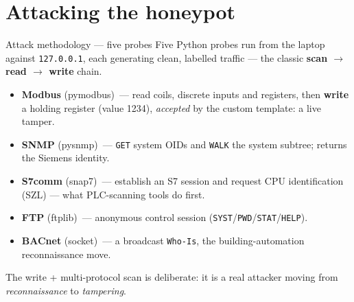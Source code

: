\documentclass[aspectratio=169,11pt]{beamer}
\newcommand{\seq}{scan $\to$ read $\to$ write}
\begin{document}
\section{Attacking the honeypot}
\begin{frame}{Attack methodology --- five probes}
  Five Python probes run from the laptop against \texttt{127.0.0.1}, each generating clean,
  labelled traffic --- the classic \textbf{\seq} chain.
  \vfill
  \begin{itemize}
    \item \textbf{Modbus} \scriptsize(pymodbus)\normalsize\ --- read coils, discrete inputs and
          registers, then \textbf{write} a holding register (value 1234), \emph{accepted} by the
          custom template: a live tamper.
    \item \textbf{SNMP} \scriptsize(pysnmp)\normalsize\ --- \texttt{GET} system OIDs and \texttt{WALK}
          the system subtree; returns the Siemens identity.
    \item \textbf{S7comm} \scriptsize(snap7)\normalsize\ --- establish an S7 session and request CPU
          identification (SZL) --- what PLC-scanning tools do first.
    \item \textbf{FTP} \scriptsize(ftplib)\normalsize\ --- anonymous control session
          (\texttt{SYST}/\texttt{PWD}/\texttt{STAT}/\texttt{HELP}).
    \item \textbf{BACnet} \scriptsize(socket)\normalsize\ --- a broadcast \texttt{Who-Is}, the
          building-automation reconnaissance move.
  \end{itemize}
  \vfill
  {\footnotesize The write + multi-protocol scan is deliberate: it is a real attacker moving from
  \emph{reconnaissance} to \emph{tampering}.}
\end{frame}

\end{document}

